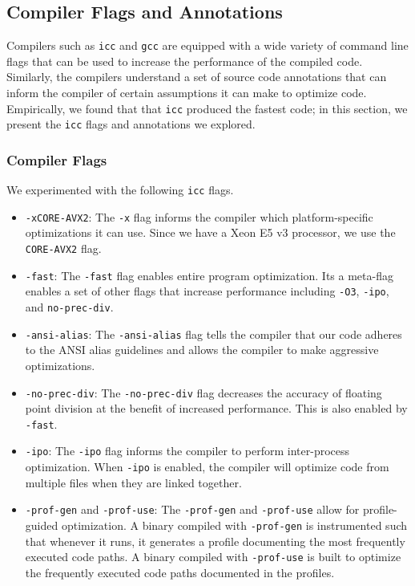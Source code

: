 \newcommand{\ttt}[1]{\texttt{#1}}
\newcommand{\icc}{\texttt{icc}}
\newcommand{\gcc}{\texttt{gcc}}

\subsection{Compiler Flags and Annotations}
Compilers such as \icc{} and \gcc{} are equipped with a wide variety of command
line flags that can be used to increase the performance of the compiled code.
Similarly, the compilers understand a set of source code annotations that can
inform the compiler of certain assumptions it can make to optimize code.
Empirically, we found that that \icc{} produced the fastest code; in this
section, we present the \icc{} flags and annotations we explored.

\subsubsection{Compiler Flags}
We experimented with the following \icc{} flags.

\begin{itemize}
  \item \ttt{-xCORE-AVX2}:
    The \ttt{-x} flag informs the compiler which platform-specific
    optimizations it can use. Since we have a Xeon E5 v3 processor, we use the
    \ttt{CORE-AVX2} flag.

  \item \ttt{-fast}:
    The \ttt{-fast} flag enables entire program optimization. Its a meta-flag
    enables a set of other flags that increase performance including \ttt{-O3},
    \ttt{-ipo}, and \ttt{no-prec-div}.

  \item \ttt{-ansi-alias}:
    The \ttt{-ansi-alias} flag tells the compiler that our code adheres to the
    ANSI alias guidelines and allows the compiler to make aggressive
    optimizations.

  \item \ttt{-no-prec-div}:
    The \ttt{-no-prec-div} flag decreases the accuracy of floating point
    division at the benefit of increased performance. This is also enabled by
    \ttt{-fast}.

  \item \ttt{-ipo}:
    The \ttt{-ipo} flag informs the compiler to perform inter-process
    optimization. When \ttt{-ipo} is enabled, the compiler will optimize code
    from multiple files when they are linked together.

  \item \ttt{-prof-gen} and \ttt{-prof-use}:
    The \ttt{-prof-gen} and \ttt{-prof-use} allow for profile-guided
    optimization. A binary compiled with \ttt{-prof-gen} is instrumented such
    that whenever it runs, it generates a profile documenting the most
    frequently executed code paths. A binary compiled with \ttt{-prof-use} is
    built to optimize the frequently executed code paths documented in the
    profiles.
\end{itemize}

